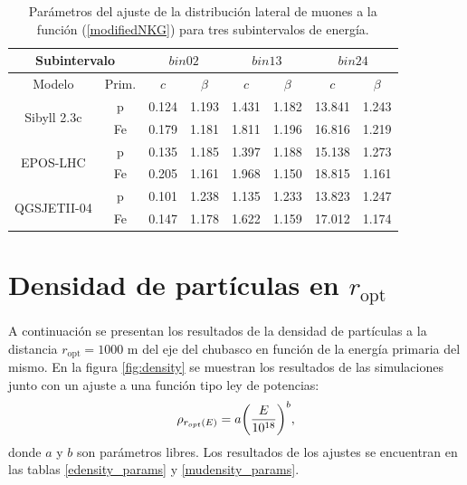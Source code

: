 \begin{table}[] 
\centering
\caption{Parámetros del ajuste de la distribución lateral de muones a la función (\ref{modifiedNKG}) para tres subintervalos de energía.}
\begin{tabular}{cc|cc|cc|cc}
\hline
\multicolumn{2}{c|}{Subintervalo}                          & \multicolumn{2}{c|}{$bin02$} & \multicolumn{2}{c|}{$bin13$} & \multicolumn{2}{c}{$bin24$} \\ \hline
\multicolumn{1}{c|}{Modelo}                       & Prim. & $c$          & $\beta$       & $c$          & $\beta$       & $c$          & $\beta$       \\ \hline
\multicolumn{1}{c|}{\multirow{2}{*}{Sibyll 2.3c}} & p     & 0.124        & 1.193         & 1.431        & 1.182         & 13.841       & 1.243         \\
\multicolumn{1}{c|}{}                             & Fe    & 0.179        & 1.181         & 1.811        & 1.196         & 16.816       & 1.219         \\ \hline
\multicolumn{1}{c|}{\multirow{2}{*}{EPOS-LHC}}    & p     & 0.135        & 1.185         & 1.397        & 1.188         & 15.138       & 1.273         \\
\multicolumn{1}{c|}{}                             & Fe    & 0.205        & 1.161         & 1.968        & 1.150         & 18.815       & 1.161         \\ \hline
\multicolumn{1}{c|}{\multirow{2}{*}{QGSJETII-04}} & p     & 0.101        & 1.238         & 1.135        & 1.233         & 13.823       & 1.247         \\
\multicolumn{1}{c|}{}                             & Fe    & 0.147        & 1.178         & 1.622        & 1.159         & 17.012       & 1.174         \\ \hline
\end{tabular}
\label{mudistlat_binparams}
\end{table}
	 

\section{Densidad de partículas en $r_{\text{opt}}$}
A continuación se presentan los resultados de la densidad de partículas a la distancia $r_{\text{opt}}=1000$ m del eje del chubasco en función de la energía primaria del mismo. En la figura \ref{fig:density} se muestran los resultados de las simulaciones junto con un ajuste a una función tipo ley de potencias:
\begin{align} \label{powerlaw}
\rho_{r_{opt}(E)} = a \qty(\frac{E}{10^{18}})^b,
\end{align}
donde $a$ y $b$ son parámetros libres. Los resultados de los ajustes se encuentran en las tablas \ref{edensity_params} y \ref{mudensity_params}. \\

